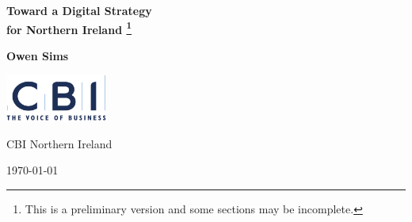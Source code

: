 \documentclass[10pt,fleqn]{book}
\begin{document}
\begin{titlepage}
    \begin{center}
        \vspace*{1cm}
        
        \huge
        \textbf{Toward a Digital Strategy\\for Northern Ireland \footnote[2]{This is a preliminary version and some sections may be incomplete.}}
        
        \large
        \textbf{Owen Sims}
        
        \vfill
        
        \includegraphics[width=0.25\textwidth]{images/cbi-logo.png}
        
        \large
        CBI Northern Ireland
        
        \today
    \end{center}
\end{titlepage}

\setcounter{tocdepth}{2}
\tableofcontents





\appendix


\singlespace
{}


\end{document}
